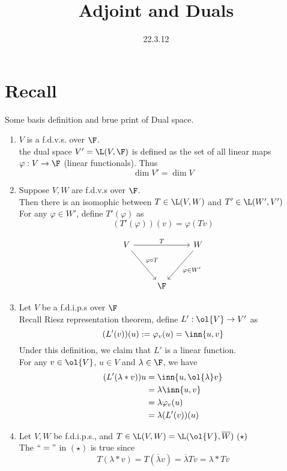 \documentclass{mathnote}
\title{Adjoint and Duals}
\date{22.3.12}
\begin{document}
    \section*{Recall} Some basis definition and brue print of Dual space.
    \begin{enumerate}
        \item   $V$ is a f.d.v.s. over $\F$.\\
                the dual space $V' = \L(V, \F)$ is defined as the set of all linear maps $\varphi: V\to \F $ (linear functionals).
                Thus
                \[\dim V' = \dim V\]
        \item   Suppose $V,W$ are f.d.v.s over $\F$.\\
                Then there is an isomophic between $T\in \L(V,W) $ and $ T' \in \L(W',V')$\\
                For any $\varphi \in W'$, define $T' (\varphi) $ as
                \[(T'(\varphi))(v) = \varphi (Tv)\]
                
                \[
                \begin{tikzcd}[row sep=3.5em]
                V \arrow[dr,"\varphi \circ T"] \arrow[rr,"T"] && W \arrow[dl, "\varphi \in W'"]\\
                & \F
                \end{tikzcd}
                \]
        \item   Let $V$ be a f.d.i.p.s over $\F$\\
                Recall Riesz representation theorem, define $L' : \ol{V}\to V' $ as
                \[(L'(v))(u) := \varphi_v(u) = \inn{u,v}\]
                Under this definition, we claim that $L'$ is a linear function.\\
                For any $v\in \ol{V}$, $u \in V$ and $\lambda \in \F$, we have
                \begin{align*}
                    (L'(\lambda * v))u &= \inn{u, \ol{\lambda}v}\\
                    &= \lambda\inn{u,v}\\
                    &= \lambda\varphi_v(u)\\
                    &= \lambda(L'(v))(u)
                \end{align*}
        \item   Let $V, W$ be f.d.i.p.s., and $T\in \L(V,W)= \L(\ol{V},\overline{W})\ (\star)$\\
                The $``="$ in $(\star)$ is true since
                \[T(\lambda * v) = T(\overline{\lambda}v) = \overline{\lambda} Tv = \lambda * Tv\]


\end{enumerate}
\end{document}
